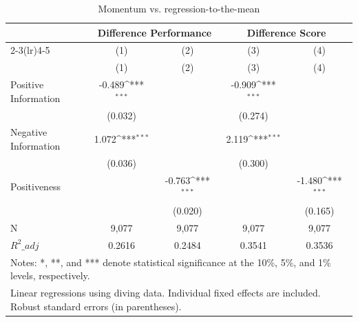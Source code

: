 \begin{table}[htbp]\centering
\def\sym#1{\ifmmode^{#1}\else\(^{#1}\)\fi}
\caption{Momentum vs. regression-to-the-mean}
\begin{tabular}{l*{4}{c}}
\toprule
                    &\multicolumn{2}{c}{Difference Performance} &\multicolumn{2}{c}{Difference Score}       \\\cmidrule(lr){2-3}\cmidrule(lr){4-5}
                    &\multicolumn{1}{c}{(1)}&\multicolumn{1}{c}{(2)}&\multicolumn{1}{c}{(3)}&\multicolumn{1}{c}{(4)}\\
                    &\multicolumn{1}{c}{(1)}&\multicolumn{1}{c}{(2)}&\multicolumn{1}{c}{(3)}&\multicolumn{1}{c}{(4)}\\
\midrule
Positive Information&      -0.489\sym{***}&                     &      -0.909\sym{***}&                     \\
                    &     (0.032)         &                     &     (0.274)         &                     \\
\addlinespace
Negative Information&       1.072\sym{***}&                     &       2.119\sym{***}&                     \\
                    &     (0.036)         &                     &     (0.300)         &                     \\
\addlinespace
Positiveness        &                     &      -0.763\sym{***}&                     &      -1.480\sym{***}\\
                    &                     &     (0.020)         &                     &     (0.165)         \\
\midrule
N                   &       9,077         &       9,077         &       9,077         &       9,077         \\
\(R^2\_{adj}\)       &      0.2616         &      0.2484         &      0.3541         &      0.3536         \\
\bottomrule
\multicolumn{5}{l}{\footnotesize Notes: *, **, and *** denote statistical significance at the 10\%, 5\%, and 1\% levels, respectively.}\\
\multicolumn{5}{l}{\footnotesize Linear regressions using diving data. Individual fixed effects are included. Robust standard errors (in parentheses).}\\
\end{tabular}
\end{table}
